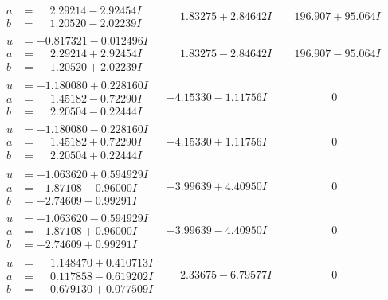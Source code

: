 \documentclass[1p]{elsarticle_modified}
\theoremstyle{definition}
\begin{document}
$$\begin{array}{c|c|c}
\begin{aligned}
a &= \phantom{-}2.29214 - 2.92454 I \\
b &= \phantom{-}1.20520 - 2.02239 I\end{aligned}
 & \phantom{-}1.83275 + 2.84642 I & \phantom{-}196.907 + 95.064 I \\ \hline\begin{aligned}
u &= -0.817321 - 0.012496 I \\
a &= \phantom{-}2.29214 + 2.92454 I \\
b &= \phantom{-}1.20520 + 2.02239 I\end{aligned}
 & \phantom{-}1.83275 - 2.84642 I & \phantom{-}196.907 - 95.064 I \\ \hline\begin{aligned}
u &= -1.180080 + 0.228160 I \\
a &= \phantom{-}1.45182 - 0.72290 I \\
b &= \phantom{-}2.20504 - 0.22444 I\end{aligned}
 & -4.15330 - 1.11756 I & \phantom{-0.000000 } 0 \\ \hline\begin{aligned}
u &= -1.180080 - 0.228160 I \\
a &= \phantom{-}1.45182 + 0.72290 I \\
b &= \phantom{-}2.20504 + 0.22444 I\end{aligned}
 & -4.15330 + 1.11756 I & \phantom{-0.000000 } 0 \\ \hline\begin{aligned}
u &= -1.063620 + 0.594929 I \\
a &= -1.87108 - 0.96000 I \\
b &= -2.74609 - 0.99291 I\end{aligned}
 & -3.99639 + 4.40950 I & \phantom{-0.000000 } 0 \\ \hline\begin{aligned}
u &= -1.063620 - 0.594929 I \\
a &= -1.87108 + 0.96000 I \\
b &= -2.74609 + 0.99291 I\end{aligned}
 & -3.99639 - 4.40950 I & \phantom{-0.000000 } 0 \\ \hline\begin{aligned}
u &= \phantom{-}1.148470 + 0.410713 I \\
a &= \phantom{-}0.117858 - 0.619202 I \\
b &= \phantom{-}0.679130 + 0.077509 I\end{aligned}
 & \phantom{-}2.33675 - 6.79577 I & \phantom{-0.000000 } 0 \\ \hline\begin{aligned}

\end{aligned}
\end{array}$$
\end{document}
